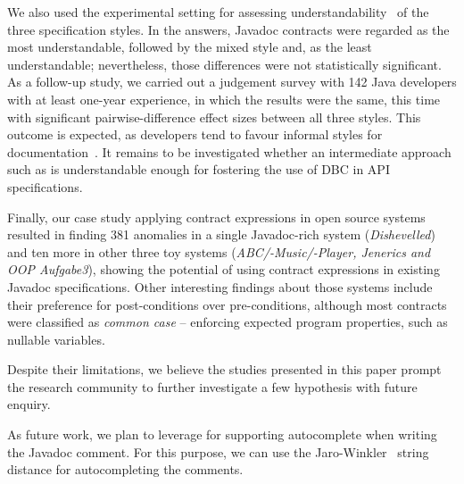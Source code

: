 We also used the experimental setting for assessing understandability~\cite{Scalabrino2017} of the three  specification styles. 
In the answers, Javadoc contracts were regarded as the most understandable, followed by the mixed \contractjdoc{} style and, as the least understandable; nevertheless, those differences were not statistically significant. As a follow-up study, we carried out a judgement survey with 142 Java developers with at least one-year experience, in which the results were the same, this time with significant pairwise-difference effect sizes between all three styles.
This outcome is expected, as developers tend to favour informal styles for documentation~\cite{Polikarpova-etal09}. It remains to be investigated whether an intermediate approach such as \contractjdoc{} is understandable enough for fostering the use of DBC in API specifications.

Finally, our case study applying contract expressions in open source systems resulted in finding 381 anomalies in a single Javadoc-rich system (\emph{Dishevelled}) and ten more in other three toy systems (\emph{ABC/-Music/-Player, Jenerics and OOP Aufgabe3}), showing the potential of using contract expressions in existing Javadoc specifications.
Other interesting findings about those systems include their preference for post-conditions over pre-conditions, although most contracts were classified as \emph{common case} -- enforcing expected program properties, such as nullable variables.

Despite their limitations, we believe the studies presented in this paper prompt the research community to further investigate a few hypothesis with future enquiry. 




As future work, we plan to leverage \contractjdoc{} for
supporting autocomplete when writing the Javadoc comment. For this purpose, we
can use the Jaro-Winkler~\cite{jaro,winkler99} string distance for
autocompleting the comments.






